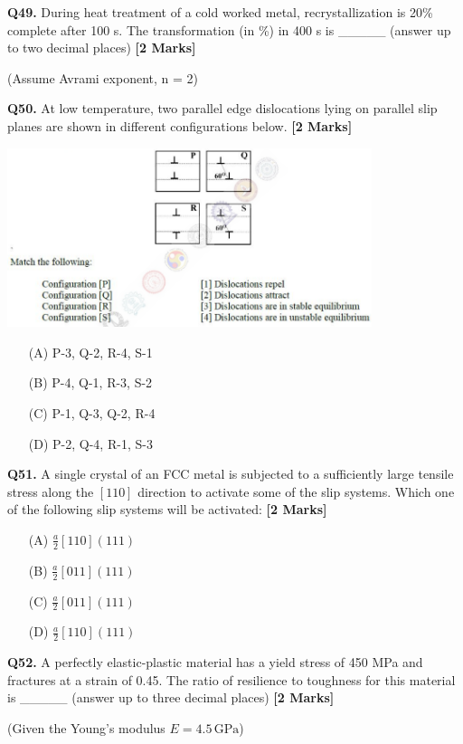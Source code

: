 \documentclass[11pt]{article}
\newcommand{\questionb}[2]{
    \noindent\textbf{Q#2.} #1 \hfill \textbf{[2 Marks]}
}
\begin{document}
\questionb{During heat treatment of a cold worked metal, recrystallization is 20\% complete after 100 s. The transformation (in \%) in 400 s is \_\_\_\_\_ (answer up to two decimal places)}{49}
(Assume Avrami exponent, n = 2)
\vspace{0.5cm}

\questionb{At low temperature, two parallel edge dislocations lying on parallel slip planes are shown in different configurations below.}{50}
\begin{center}
\includegraphics[width=0.8\textwidth]{figures/50.png}
\end{center}
\begin{enumerate}
    \item[(A)] P-3, Q-2, R-4, S-1
    \item[(B)] P-4, Q-1, R-3, S-2
    \item[(C)] P-1, Q-3, Q-2, R-4
    \item[(D)] P-2, Q-4, R-1, S-3
\end{enumerate}
\vspace{0.5cm}

\questionb{A single crystal of an FCC metal is subjected to a sufficiently large tensile stress along the \([110]\) direction to activate some of the slip systems. Which one of the following slip systems will be activated:}{51}
\begin{enumerate}
    \item[(A)] \(\frac{a}{2}[110](111)\)
    \item[(B)] \(\frac{a}{2}[011](111)\)
    \item[(C)] \(\frac{a}{2}[011](111)\)
    \item[(D)] \(\frac{a}{2}[110](111)\)
\end{enumerate}
\vspace{0.5cm}

\questionb{A perfectly elastic-plastic material has a yield stress of 450 MPa and fractures at a strain of 0.45. The ratio of resilience to toughness for this material is \_\_\_\_\_ (answer up to three decimal places)}{52}
(Given the Young's modulus \( E = 4.5 \, \text{GPa} \))
\vspace{0.5cm}
\end{document}
